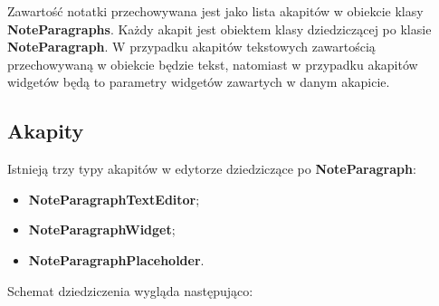 Zawartość notatki przechowywana jest jako lista akapitów w obiekcie klasy \textbf{NoteParagraphs}. Każdy akapit jest obiektem klasy dziedziczącej po klasie \textbf{NoteParagraph}. W przypadku akapitów tekstowych zawartością przechowywaną w obiekcie będzie tekst, natomiast w przypadku akapitów widgetów będą to parametry widgetów zawartych w danym akapicie.

\subsection{Akapity}

Istnieją trzy typy akapitów w edytorze dziedziczące po \textbf{NoteParagraph}: 
\begin{itemize}
    \item \textbf{NoteParagraphTextEditor};
    \item \textbf{NoteParagraphWidget};
    \item \textbf{NoteParagraphPlaceholder}.
\end{itemize}

Schemat dziedziczenia wygląda następująco:








